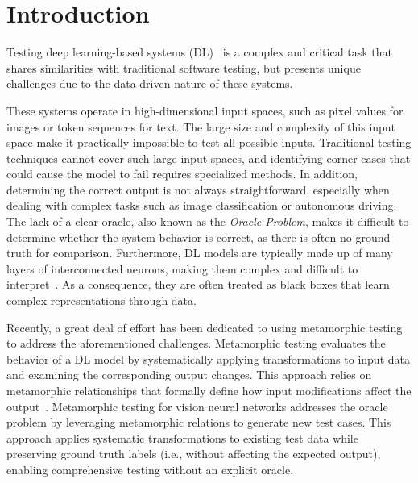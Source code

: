 \section{Introduction}
\label{sec:intro}
Testing deep learning-based systems (DL)~\cite{GoodBengCour16} is a complex and critical task that shares similarities with traditional software testing, but presents unique challenges due to the data-driven nature of these systems.

These systems operate in high-dimensional input spaces, such as pixel values for images or token sequences for text. The large size and complexity of this input space make it practically impossible to test all possible inputs. Traditional testing techniques cannot cover such large input spaces, and identifying corner cases that could cause the model to fail requires specialized methods.
In addition, determining the correct output is not always straightforward, especially when dealing with complex tasks such as image classification or autonomous driving. The lack of a clear oracle, also known as the \textit{Oracle Problem}, makes it difficult to determine whether the system behavior is correct, as there is often no ground truth for comparison.
Furthermore, DL models are typically made up of many layers of interconnected neurons, making them complex and difficult to interpret~\cite{DBLP:journals/tse/ZhangHML22}.
As a consequence, they are often treated as black boxes that learn complex representations through data.

Recently, a great deal of effort has been dedicated to using metamorphic testing~\cite{DBLP:conf/icse/ZhouLKGZ0Z020, DBLP:journals/pacmse/ChenJYGZC24} to address the aforementioned challenges.
Metamorphic testing evaluates the behavior of a DL model by systematically applying transformations to input data and examining the corresponding output changes. This approach relies on metamorphic relationships that formally define how input modifications affect the output~\cite{DBLP:conf/icse/DingKH17}.
Metamorphic testing for vision neural networks addresses the oracle problem by leveraging metamorphic relations to generate new test cases. This approach applies systematic transformations to existing test data while preserving ground truth labels (i.e., without affecting the expected output), enabling comprehensive testing without an explicit oracle.

